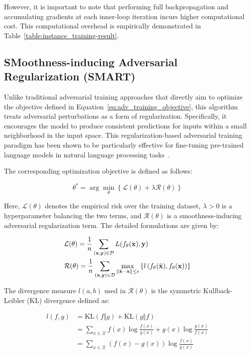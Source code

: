 \documentclass[10pt,twocolumn,letterpaper]{article}
\begin{document}
However, it is important to note that performing full backpropagation and accumulating gradients at each inner-loop iteration incurs higher computational cost. This computational overhead is empirically demonstrated in Table~\ref{table:instance_training-result}.

\subsection{SMoothness-inducing Adversarial Regularization (SMART)}

Unlike traditional adversarial training approaches that directly aim to optimize the objective defined in Equation~\ref{eq:adv_training_objective}, this algorithm treats adversarial perturbations as a form of regularization. Specifically, it encourages the model to produce consistent predictions for inputs within a small neighborhood in the input space. This regularization-based adversarial training paradigm has been shown to be particularly effective for fine-tuning pre-trained language models in natural language processing tasks~\cite{Jiang_2020}.

The corresponding optimization objective is defined as follows:

\begin{equation}
\theta^* = \arg\min_\theta\left\{\mathcal{L}(\theta) + \lambda \mathcal{R}(\theta)\right\}
\tag{2:4:1}
\label{formula:adversarial_target2}
\end{equation}

Here, $\mathcal{L}(\theta)$ denotes the empirical risk over the training dataset, $\lambda > 0$ is a hyperparameter balancing the two terms, and $\mathcal{R}(\theta)$ is a smoothness-inducing adversarial regularization term. The detailed formulations are given by:

$$
\begin{aligned}
  &\mathcal{L}(\theta)=\frac{1}{n}\sum_{(\bf{x}, \bf{y})\in\mathcal{D}} L(f_\theta(\bf{x}), \bf{y}) \\
  &\mathcal{R}(\theta)=\frac{1}{n}\sum_{(\bf{x}, \bf{y})\in\mathcal{D}} \max_{\left\Vert \tilde{\bf{x}}-\bf{x}\right\Vert\leq \epsilon}\left\{l\left(f_\theta(\tilde{\bf{x}}), f_\theta(\bf{x})\right)\right\}
\end{aligned}
$$

The divergence measure $l(a, b)$ used in $\mathcal{R}(\theta)$ is the symmetric Kullback-Leibler (KL) divergence defined as:

$$
\begin{aligned}
l(f, g)&=\mathrm{KL}(f\Vert g) + \mathrm{KL}(g\Vert f) \\
&=\sum_{x\in \mathcal{X}} f(x)\log\frac{f(x)}{g(x)} + g(x)\log\frac{g(x)}{f(x)} \\
&=\sum_{x\in \mathcal{X}} (f(x) - g(x))\log\frac{f(x)}{g(x)}
\end{aligned}
$$
\end{document}
